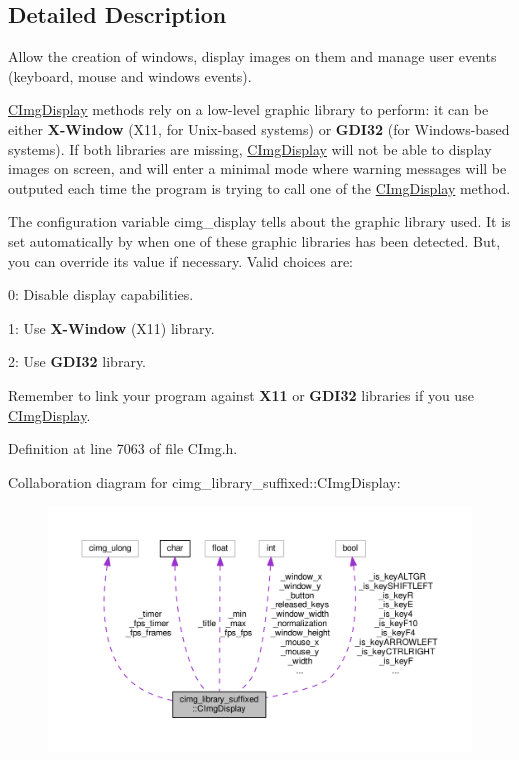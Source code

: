 \subsection{Detailed Description}
Allow the creation of windows, display images on them and manage user events (keyboard, mouse and windows events). 

\hyperlink{structcimg__library__suffixed_1_1CImgDisplay}{C\+Img\+Display} methods rely on a low-\/level graphic library to perform\+: it can be either {\bfseries X-\/\+Window} (X11, for Unix-\/based systems) or {\bfseries G\+D\+I32} (for Windows-\/based systems). If both libraries are missing, \hyperlink{structcimg__library__suffixed_1_1CImgDisplay}{C\+Img\+Display} will not be able to display images on screen, and will enter a minimal mode where warning messages will be outputed each time the program is trying to call one of the \hyperlink{structcimg__library__suffixed_1_1CImgDisplay}{C\+Img\+Display} method.

The configuration variable {\ttfamily cimg\+\_\+display} tells about the graphic library used. It is set automatically by  when one of these graphic libraries has been detected. But, you can override its value if necessary. Valid choices are\+:
\begin{DoxyItemize}
\item 0\+: Disable display capabilities.
\item 1\+: Use {\bfseries X-\/\+Window} (X11) library.
\item 2\+: Use {\bfseries G\+D\+I32} library.
\end{DoxyItemize}

Remember to link your program against {\bfseries X11} or {\bfseries G\+D\+I32} libraries if you use \hyperlink{structcimg__library__suffixed_1_1CImgDisplay}{C\+Img\+Display}. 

Definition at line 7063 of file C\+Img.\+h.



Collaboration diagram for cimg\+\_\+library\+\_\+suffixed\+:\+:C\+Img\+Display\+:
\nopagebreak
\begin{figure}[H]
\begin{center}
\leavevmode
\includegraphics[width=350pt]{d4/dc5/structcimg__library__suffixed_1_1CImgDisplay__coll__graph}
\end{center}
\end{figure}


